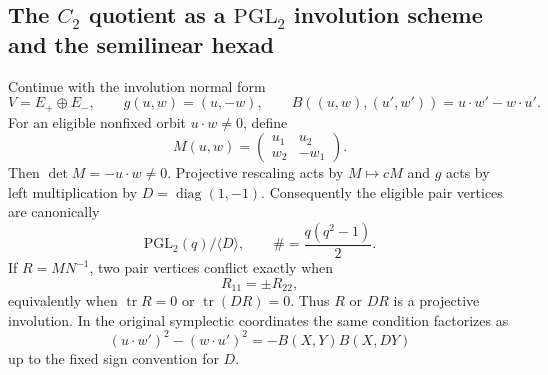 \subsection{The $C_2$ quotient as a $\mathrm{PGL}_2$ involution scheme and the semilinear hexad}
\label{sec:pass7146-7153-pgl2-hexad}

Continue with the involution normal form
\[
 V=E_+\oplus E_-,\qquad g(u,w)=(u,-w),\qquad
 B((u,w),(u',w'))=u\cdot w'-w\cdot u'.
\]
For an eligible nonfixed orbit $u\cdot w\ne0$, define
\[
 M(u,w)=\begin{pmatrix}u_1&u_2\\ w_2&-w_1\end{pmatrix}.
\]
Then $\det M=-u\cdot w\ne0$.  Projective rescaling acts by $M\mapsto cM$ and $g$ acts by left multiplication by $D=\operatorname{diag}(1,-1)$.  Consequently the eligible pair vertices are canonically
\[
 \boxed{\mathrm{PGL}_2(q)/\langle D\rangle},
 \qquad \#=\frac{q(q^2-1)}2.
\]
If $R=MN^{-1}$, two pair vertices conflict exactly when
\[
 R_{11}=\pm R_{22},
\]
equivalently when $\operatorname{tr}R=0$ or $\operatorname{tr}(DR)=0$.  Thus $R$ or $DR$ is a projective involution.  In the original symplectic coordinates the same condition factorizes as
\[
 (u\cdot w')^2-(w\cdot u')^2
 =-B(X,Y)B(X,DY)
\]
up to the fixed sign convention for $D$.

